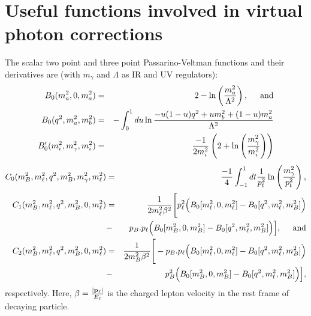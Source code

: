 \documentclass[a4paper,11pt]{article}
\begin{document}
		\section{Useful functions involved in virtual photon corrections}
		\label{appe}
		The scalar two point and three point Passarino-Veltman functions and their derivatives are (with $m_{\gamma}$ and $\Lambda$ as IR and UV regulators):
		\begin{eqnarray}
		B_{0}(m_{a}^{2},0, m_{a}^{2})&=& 2-\ln\left(\frac{m_{a}^{2}}{\Lambda^{2}}\right)\label{3}, \hspace{0.5cm} \text{and}\\
		B_{0}(q^{2},m_{a}^{2}, m_{b}^{2}) &=& -\int_{0}^{1}du \ln\frac{-u(1-u)q^{2} + u m_{b}^{2}+(1-u)m_{a}^{2}}{\Lambda^{2}}\\
			B'_{0}(m_{i}^{2},m_{\gamma}^{2}, m_{i}^{2})&=& \frac{-1}{2m_{i}^{2}}\left(2+\ln\left(\frac{m_{\gamma}^{2}}{m_{i}^{2}}\right)\right)
		\end{eqnarray} 
		\begin{eqnarray}
		C_{0}(m_{B}^{2}, m_{\ell}^{2}, q^{2}, m_{B}^{2}, m_{\gamma}^{2}, m_{\ell}^{2}) &=&\frac{-1}{4} \int_{-1}^{1} dt \frac{1}{p_{t}^{2}}\ln\left(\frac{m_{\gamma}^{2}}{p_{t}^{2}}\right),\\
		C_{1}(m_{B}^{2}, m_{\ell}^{2}, q^{2}, m_{B}^{2}, 0, m_{\ell}^{2}) &=&\frac{1}{2m_{\ell}^2\beta^2}\Bigg[p_{\ell}^2\Big(B_{0}[m_{\ell}^2,0,m_{\ell}^2]-B_0[q^2,m_{\ell}^2,m_B^2]\Big)\nonumber\\&-& p_B.p_{\ell}\Big(B_{0}[m_B^2,0,m_B^2]- B_0[q^2,m_{\ell}^2,m_B^2]\Big)\Big], \hspace{0.5cm} \text{and}\\
		 C_{2}(m_{B}^{2}, m_{\ell}^{2}, q^{2}, m_{B}^{2}, 0, m_{\ell}^{2}) &=&\frac{1}{2m_{B}^2\beta^2}\Bigg[-p_B.p_{\ell}\Big(B_{0}[m_{\ell}^2,0,m_{\ell}^2]-B_0[q^2,m_{\ell}^2,m_B^2]\Big)\nonumber\\&-&p_B^2\Big(B_{0}[m_B^2,0,m_B^2]- B_0[q^2,m_{\ell}^2,m_B^2]\Big)\Big],
		\end{eqnarray} 
		respectively. Here, $\beta=\frac{|\bold{p_{\ell}}|}{E_{\ell}}$ is the charged lepton velocity in the rest frame of decaying particle. 



\end{document}
